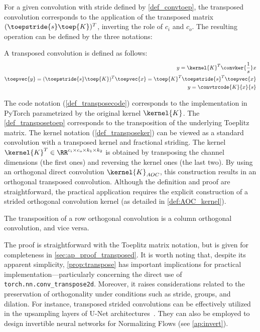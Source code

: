     For a given convolution with stride defined by  \cref{def_convtoep}, the transposed convolution corresponds to the application of the transposed matrix $(\toepstride{s} \toep{K})^T$, inverting the role of $c_i$ and $c_o$. 
    The resulting operation can be defined by the three notations:
    \begin{definition}\label{def_transpose}
        A transposed convolution is defined as follows:
        \begin{align}
            y = \kernel{K}^T \convker{\frac{1}{s}} x \label{def_transposeker}\\
            \toepvec{y} = (\toepstride{s} \toep{K})^T \toepvec{x} = \toep{K}^T \toepstride{s}^T \toepvec{x} \label{def_transposetoep} \\
            y = \convtrcode{K}{x}{s} \label{def_transposecode}
        \end{align}
    \end{definition}
        The code notation (\cref{def_transposecode}) corresponds to the implementation in PyTorch parametrized by the original kernel $\kernel{K}$. The \cref{def_transposetoep} corresponds to the transposition of the underlying Toeplitz matrix. %
        The kernel notation (\cref{def_transposeker}) can be viewed as a standard convolution with a transposed kernel and fractional striding. The kernel $\kernel{K}^T \in \RR^{c_i \times c_o \times k_1 \times k_2}$ is obtained by transposing the channel dimensions (the first ones) and reversing the kernel ones (the last two). 
    By using an orthogonal direct convolution $\kernel{K}_{AOC}$, this construction results in an orthogonal transposed convolution. Although the definition and proof are straightforward, the practical application requires the explicit construction of a strided orthogonal convolution kernel (as detailed in \cref{def:AOC_kernel}).

    \begin{proposition}\label{prop:transpose}
        The transposition of a row orthogonal convolution is a column orthogonal convolution, and vice versa.  
    \end{proposition}

    The proof is straightforward with the Toeplitz matrix notation, but is given for completeness in \cref{sec:ap_proof_transposed}.
    It is worth noting that, despite its apparent simplicity, \cref{prop:transpose} has important implications for practical implementation—particularly concerning the direct use of \texttt{torch.nn.conv\_transpose2d}. Moreover, it raises considerations related to the preservation of orthogonality under conditions such as stride, groups, and dilation. For instance, transposed strided convolutions can be effectively utilized in the upsampling layers of U-Net architectures~\cite{ronneberger2015u}.
    They can also be employed to design invertible neural networks for Normalizing Flows (see \cref{ap:invert}).

